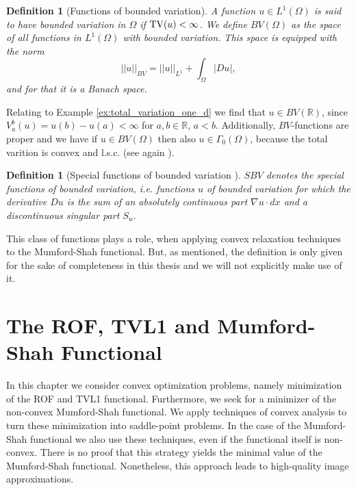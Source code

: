 \documentclass[abstracton]{scrreprt}
\newtheorem{definition}[theorem]{Definition}
\begin{document}
        \begin{definition}[Functions of bounded variation]
        \label{def:functions_of_bounded_variation}
            A function $u \in L^{1}(\Omega)$ is said to have bounded variation in $\Omega$ if $\textnormal{TV}(u) < \infty$. We define $BV(\Omega)$ as the space of all functions in $L^{1}(\Omega)$ with bounded variation. This space is equipped with the norm
                $$
                    ||u||_{BV} = ||u||_{L^{1}} + \int_{\Omega} |Du|,
                $$
            and for that it is a Banach space.
        \end{definition}
        Relating to Example \ref{ex:total_variation_one_d} we find that $u \in BV(\mathbb{R})$, since $V^{b}_{a}(u) = u(b) - u(a) < \infty$ for $a, b \in \mathbb{R}$, $a < b$.
        Additionally, $BV$-functions are proper and we have if $u \in BV(\Omega)$ then also $u \in \Gamma_{0}(\Omega)$, because the total varition is convex and l.s.c. (see again \cite{Chambolle-et-al-10}).
        \begin{definition}[Special functions of bounded variation \cite{Pock-et-al-iccv09}]
            $SBV$ denotes the special functions of bounded variation, i.e. functions $u$ of bounded variation for which the derivative $Du$ is the sum of an absolutely continuous part $\nabla u \cdot dx$ and a discontinuous singular part $S_{u}$.
        \end{definition}
        This class of functions plays a role, when applying convex relaxation techniques to the Mumford-Shah functional. But, as mentioned, the definition is only given for the sake of completeness in this thesis and we will not explicitly make use of it.



\chapter{The ROF, TVL1 and Mumford-Shah Functional} %
\label{cha:the_rof_tvl1_and_mumford_shah_functional}

    In this chapter we consider convex optimization problems, namely minimization of the ROF and TVL1 functional. Furthermore, we seek for a minimizer of the non-convex Mumford-Shah functional. We apply techniques of convex analysis to turn these minimization into saddle-point problems. In the case of the Mumford-Shah functional we also use these techniques, even if the functional itself is non-convex. There is no proof that this strategy yields the minimal value of the Mumford-Shah functional. Nonetheless, this approach leads to high-quality image approximations.
\end{document}
